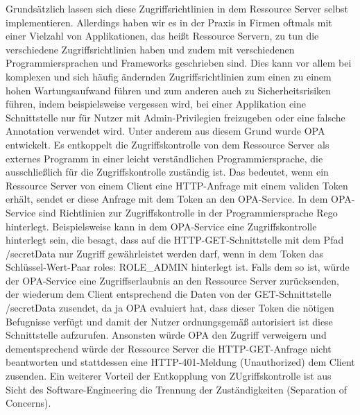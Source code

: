 Grundsätzlich lassen sich diese Zugriffsrichtlinien in dem Ressource Server selbst implementieren. Allerdings haben wir es in der Praxis in Firmen oftmals mit einer Vielzahl von Applikationen, das heißt Ressource Servern, zu tun die verschiedene Zugriffsrichtlinien haben und zudem mit verschiedenen Programmiersprachen und Frameworks geschrieben sind. Dies kann vor allem bei komplexen und sich häufig ändernden Zugriffsrichtlinien zum einen zu einem hohen Wartungsaufwand führen und zum anderen auch zu Sicherheitsrisiken führen, indem beispielsweise vergessen wird, bei einer Applikation eine Schnittstelle nur für Nutzer mit Admin-Privilegien freizugeben oder eine falsche Annotation verwendet wird. 
Unter anderem aus diesem Grund wurde \ac{OPA} entwickelt. Es entkoppelt die Zugriffskontrolle von dem Ressource Server als externes Programm in einer leicht verständlichen Programmiersprache, die ausschließlich für die Zugriffskontrolle zuständig ist. Das bedeutet, wenn ein Ressource Server von einem Client eine HTTP-Anfrage mit einem validen Token erhält, sendet er diese Anfrage mit dem Token an den OPA-Service. In dem OPA-Service sind Richtlinien zur Zugriffskontrolle in der Programmiersprache Rego hinterlegt. Beispielsweise kann in dem OPA-Service eine Zugriffskontrolle hinterlegt sein, die besagt, dass auf die HTTP-GET-Schnittstelle mit dem Pfad /secretData nur Zugriff gewährleistet werden darf, wenn in dem Token das Schlüssel-Wert-Paar roles: ROLE\_ADMIN hinterlegt ist. Falls dem so ist, würde der OPA-Service eine Zugriffserlaubnis an den Ressource Server zurücksenden, der wiederum dem Client entsprechend die Daten von der GET-Schnittstelle /secretData zusendet, da ja OPA evaluiert hat, dass dieser Token die nötigen Befugnisse verfügt und damit der Nutzer ordnungsgemäß autorisiert ist diese Schnittstelle aufzurufen. Ansonsten würde OPA den Zugriff verweigern und dementsprechend würde der Ressource Server die HTTP-GET-Anfrage nicht beantworten und stattdessen eine HTTP-401-Meldung (Unauthorized) dem Client zusenden. Ein weiterer Vorteil der Entkopplung von ZUgriffskontrolle ist aus Sicht des Software-Engineering die Trennung der Zuständigkeiten (Separation of Concerns). 

%
%

